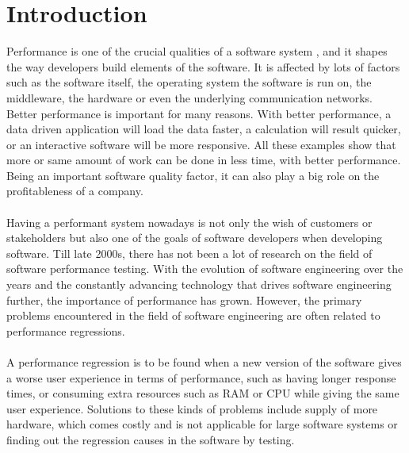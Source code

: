 \documentclass{seal_thesis}
\begin{document}
\tableofcontents
\listoffigures
\listoftables
\lstlistoflistings

\mainmatter

\chapter{Introduction}


Performance is one of the crucial qualities of a software system \cite{Woodside:2007:FSP:1253532.1254717}, and it shapes the way developers build elements of the software. It is affected by lots of factors such as the software itself, the operating system the software is run on, the middleware, the hardware or even the underlying communication networks\cite{Woodside:2007:FSP:1253532.1254717}. Better performance is important for many reasons. With better performance, a data driven application  will load the data faster, a calculation will result quicker, or an interactive software will be more responsive. All these examples show that more or same amount of work can be done in less time, with better performance. Being an important software quality factor, it can also play a big role on the profitableness of a company\cite{Nguyen:2014:ICS:2597073.2597092}\cite{costa2019}.\\
\\
Having a performant system nowadays is not only the wish of customers or stakeholders but also one of the goals of software developers when developing software. Till late 2000s, there has not been a lot of research on the field of software performance testing\cite{weyuker2000experience}. With the evolution of software engineering over the years and the constantly advancing technology that drives software engineering further, the importance of performance has grown. However, the primary problems encountered in the field of software engineering are often related to performance regressions\cite{weyuker2000experience}.\\
\\
A performance regression is to be found when a new version of the software gives a worse user experience in terms of performance, such as having longer response times, or consuming extra resources such as RAM or CPU while giving the same user experience\cite{Nguyen:2014:ICS:2597073.2597092}. Solutions to these kinds of problems include supply of more hardware, which comes costly and is not applicable for large software systems \cite{Nguyen:2014:ICS:2597073.2597092} or finding out the regression causes in the software by testing.\\
\end{document}
